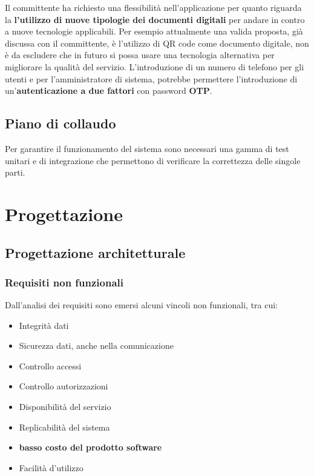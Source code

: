 \documentclass[a4paper]{article}
\begin{document}
Il committente ha richiesto una flessibilità nell'applicazione per quanto riguarda la \textbf{l'utilizzo di nuove tipologie dei documenti digitali} per andare in contro a nuove tecnologie applicabili. Per esempio attualmente una valida proposta, già discussa con il committente, è l'utilizzo di QR code come documento digitale, non è da escludere che in futuro si possa usare una tecnologia alternativa per migliorare la qualità del servizio. L'introduzione di un numero di telefono per gli utenti e per l'amministratore di sistema, potrebbe permettere l'introduzione di un'\textbf{autenticazione a due fattori} con password \textbf{OTP}.  

\newpage

\subsection{Piano di collaudo}

Per garantire il funzionamento del sistema sono necessari una gamma di test unitari e
di integrazione che permettono di verificare la correttezza delle singole parti.




\newpage

\section{Progettazione}

\subsection{Progettazione architetturale}

\subsubsection{Requisiti non funzionali}

Dall’analisi dei requisiti sono emersi alcuni vincoli non funzionali, tra cui:

\begin{itemize}
    \item Integrità dati
    \item Sicurezza dati, anche nella comunicazione
    \item Controllo accessi
    \item Controllo autorizzazioni
    \item Disponibilità del servizio
    \item Replicabilità del sistema
    \item \textbf{basso costo del prodotto software}
    \item Facilità d’utilizzo
\end{itemize}
\end{document}
